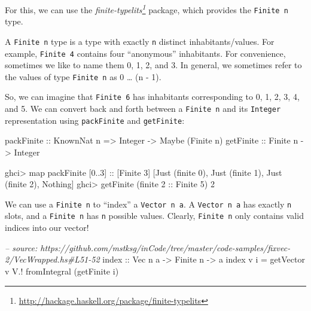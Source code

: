 \documentclass[]{article}
\newenvironment{Shaded}{}{}
\newcommand{\DataTypeTok}[1]{\textcolor[rgb]{0.56,0.13,0.00}{#1}}
\newcommand{\DecValTok}[1]{\textcolor[rgb]{0.25,0.63,0.44}{#1}}
\newcommand{\CommentTok}[1]{\textcolor[rgb]{0.38,0.63,0.69}{\textit{#1}}}
\newcommand{\OtherTok}[1]{\textcolor[rgb]{0.00,0.44,0.13}{#1}}
\newcommand{\FunctionTok}[1]{\textcolor[rgb]{0.02,0.16,0.49}{#1}}
\newcommand{\NormalTok}[1]{#1}
\renewcommand{\href}[2]{#2\footnote{\url{#1}}}
\begin{document}
For this, we can use the
\emph{\href{http://hackage.haskell.org/package/finite-typelits}{finite-typelits}}
package, which provides the \texttt{Finite\ n} type.

A \texttt{Finite\ n} type is a type with exactly \texttt{n} distinct
inhabitants/values. For example, \texttt{Finite\ 4} contains four ``anonymous''
inhabitants. For convenience, sometimes we like to name them 0, 1, 2, and 3. In
general, we sometimes refer to the values of type \texttt{Finite\ n} as 0
\ldots{} (n - 1).

So, we can imagine that \texttt{Finite\ 6} has inhabitants corresponding to 0,
1, 2, 3, 4, and 5. We can convert back and forth between a \texttt{Finite\ n}
and its \texttt{Integer} representation using \texttt{packFinite} and
\texttt{getFinite}:

\begin{Shaded}
\begin{Highlighting}[]
\OtherTok{packFinite ::} \DataTypeTok{KnownNat}\NormalTok{ n }\OtherTok{=>} \DataTypeTok{Integer}  \OtherTok{->} \DataTypeTok{Maybe}\NormalTok{ (}\DataTypeTok{Finite}\NormalTok{ n)}
\OtherTok{getFinite  ::}               \DataTypeTok{Finite}\NormalTok{ n }\OtherTok{->} \DataTypeTok{Integer}
\end{Highlighting}
\end{Shaded}

\begin{Shaded}
\begin{Highlighting}[]
\NormalTok{ghci}\FunctionTok{>}\NormalTok{ map packFinite [}\DecValTok{0}\FunctionTok{..}\DecValTok{3}\NormalTok{]}\OtherTok{ ::}\NormalTok{ [}\DataTypeTok{Finite} \DecValTok{3}\NormalTok{]}
\NormalTok{[}\DataTypeTok{Just}\NormalTok{ (finite }\DecValTok{0}\NormalTok{), }\DataTypeTok{Just}\NormalTok{ (finite }\DecValTok{1}\NormalTok{), }\DataTypeTok{Just}\NormalTok{ (finite }\DecValTok{2}\NormalTok{), }\DataTypeTok{Nothing}\NormalTok{]}
\NormalTok{ghci}\FunctionTok{>}\NormalTok{ getFinite (finite }\DecValTok{2}\OtherTok{ ::} \DataTypeTok{Finite} \DecValTok{5}\NormalTok{)}
\DecValTok{2}
\end{Highlighting}
\end{Shaded}

We can use a \texttt{Finite\ n} to ``index'' a \texttt{Vector\ n\ a}. A
\texttt{Vector\ n\ a} has exactly \texttt{n} slots, and a \texttt{Finite\ n} has
\texttt{n} possible values. Clearly, \texttt{Finite\ n} only contains valid
indices into our vector!

\begin{Shaded}
\begin{Highlighting}[]
\CommentTok{-- source: https://github.com/mstksg/inCode/tree/master/code-samples/fixvec-2/VecWrapped.hs#L51-52}
\NormalTok{index}\OtherTok{ ::} \DataTypeTok{Vec}\NormalTok{ n a }\OtherTok{->} \DataTypeTok{Finite}\NormalTok{ n }\OtherTok{->}\NormalTok{ a}
\NormalTok{index v i }\FunctionTok{=}\NormalTok{ getVector v }\FunctionTok{V.!}\NormalTok{ fromIntegral (getFinite i)}
\end{Highlighting}
\end{Shaded}
\end{document}
